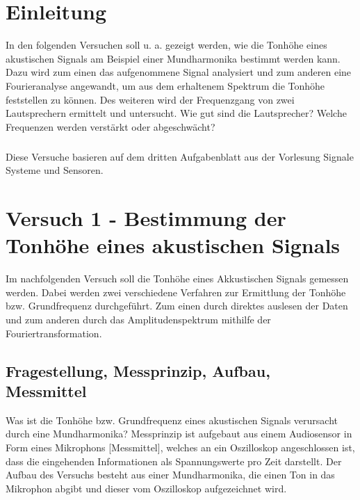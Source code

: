 \documentclass[12pt,oneside,a4paper]{report}
\begin{document}




\clearpage

%
%


%
%


%
%
%

%
%




\setcounter{page}{1}
%
%
\chapter{Einleitung}
\label{chap:EINL}

In den folgenden Versuchen soll u. a. gezeigt werden, wie die Tonhöhe eines akustischen Signals am Beispiel einer Mundharmonika bestimmt werden kann. Dazu wird zum einen das aufgenommene Signal analysiert und zum anderen eine Fourieranalyse angewandt, um aus dem erhaltenem Spektrum die Tonhöhe feststellen zu können. 
Des weiteren wird der Frequenzgang von zwei Lautsprechern ermittelt und untersucht. Wie gut sind die Lautsprecher? Welche Frequenzen werden verstärkt oder abgeschwächt?
\paragraph{}
Diese Versuche basieren auf dem dritten Aufgabenblatt \cite{Franz2015p} aus der Vorlesung Signale Systeme und Sensoren.
%
%
\chapter{Versuch 1 - Bestimmung der Tonhöhe eines akustischen Signals}
\label{chap:VERSUCH_1}
Im nachfolgenden Versuch soll die Tonhöhe eines Akkustischen Signals gemessen werden. Dabei werden zwei verschiedene Verfahren zur Ermittlung der Tonhöhe bzw. Grundfrequenz durchgeführt. Zum einen durch direktes auslesen der Daten und zum anderen durch das Amplitudenspektrum mithilfe der Fouriertransformation.

\section{Fragestellung, Messprinzip, Aufbau, Messmittel}
\label{chap:VERSUCH_1_FRAGESTELLUNG}
Was ist die Tonhöhe bzw. Grundfrequenz eines akustischen Signals verursacht durch eine Mundharmonika?
Messprinzip ist aufgebaut aus einem Audiosensor in Form eines Mikrophons [Messmittel], welches an ein Oszilloskop angeschlossen ist, dass die eingehenden Informationen als Spannungswerte pro Zeit darstellt.
Der Aufbau des Versuchs besteht aus einer Mundharmonika, die einen Ton in das Mikrophon abgibt und dieser vom Oszilloskop aufgezeichnet wird.
\end{document}
